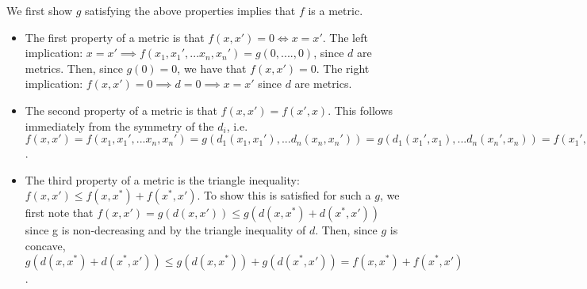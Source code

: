 We first show $g$ satisfying the above properties implies that $f$ is a metric.
\begin{itemize}
    \item The first property of a metric is that $f(x,x') = 0 \Longleftrightarrow x = x'$.  The left implication: $x = x' \implies f(x_1, x_1', ... x_n, x_n') = g(0,....,0)$, since $d$ are metrics.  Then, since $g(0) = 0$, we have that $f(x,x') = 0$. The right implication: $f(x,x') = 0 \implies  d = 0 \implies x = x'$ since $d$ are metrics.
    \item The second property of a metric is that $f(x,x') = f(x',x)$. This follows immediately from the symmetry of the $d_i$, i.e. $f(x,x') = f(x_1, x_1', ... x_n, x_n') = g(d_1(x_1, x_1'), ... d_n(x_n, x_n')) = g(d_1(x_1', x_1), ... d_n(x_n', x_n)) =  f(x_1', x_1, ... x_n', x_n) = f(x',x)$.
    \item The third property of a metric is the triangle inequality: $f(x, x') \leq f(x, x^*) +  f(x^*, x') $.  To show this is satisfied for such a $g$, we first note that $f(x,x') = g(d(x,x')) \leq g(d(x, x^*) + d(x^*, x')) $ since g is non-decreasing and by the triangle inequality of $d$. Then, since $g$ is concave, $g(d(x, x^*) + d(x^*, x')) \leq g(d(x, x^*)) + g(d(x^*, x')) = f(x,x^*) + f(x^*, x')$.
    
\end{itemize}

